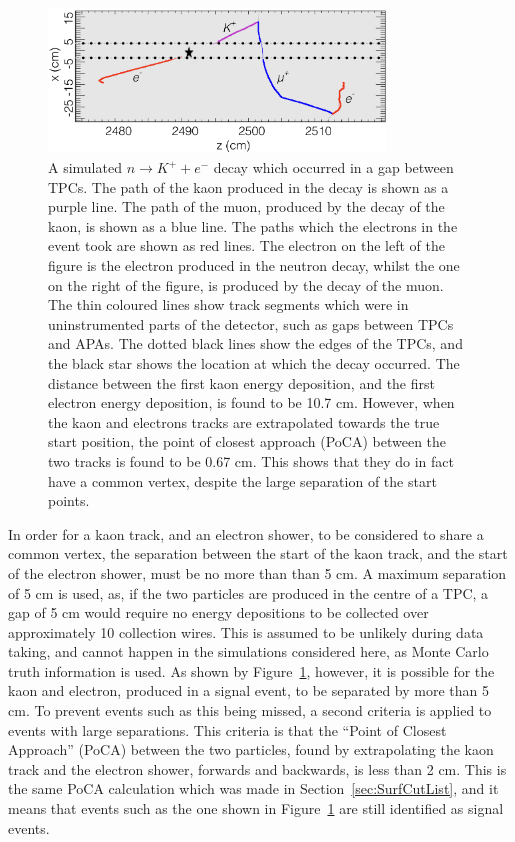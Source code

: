 \begin{figure}[h!]
  \centering
  \includegraphics[width=0.8\textwidth]{KaonElecBigGap}
  \caption[A simulated $n \rightarrow K^{+} + e^{-}$ decay which occurred in a gap between TPCs]
          {A simulated $n \rightarrow K^{+} + e^{-}$ decay which occurred in a gap between TPCs. The path of the kaon produced in the decay is shown as a purple line. The path of the muon, produced by the decay of the kaon, is shown as a blue line. The paths which the electrons in the event took are shown as red lines. The electron on the left of the figure is the electron produced in the neutron decay, whilst the one on the right of the figure, is produced by the decay of the muon. The thin coloured lines show track segments which were in uninstrumented parts of the detector, such as gaps between TPCs and APAs. The dotted black lines show the edges of the TPCs, and the black star shows the location at which the decay occurred. The distance between the first kaon energy deposition, and the first electron energy deposition, is found to be 10.7 cm. However, when the kaon and electrons tracks are extrapolated towards the true start position, the point of closest approach (PoCA) between the two tracks is found to be 0.67 cm. This shows that they do in fact have a common vertex, despite the large separation of the start points.} 
  \label{fig:NDK_Sig_KEBigGap}
\end{figure}

In order for a kaon track, and an electron shower, to be considered to share a common vertex, the separation between the start of the kaon track, and the start of the electron shower, must be no more than than 5 cm. A maximum separation of 5 cm is used, as, if the two particles are produced in the centre of a TPC, a gap of 5 cm would require no energy depositions to be collected over approximately 10 collection wires. This is assumed to be unlikely during data taking, and cannot happen in the simulations considered here, as Monte Carlo truth information is used. As shown by Figure~\ref{fig:NDK_Sig_KEBigGap}, however, it is possible for the kaon and electron, produced in a signal event, to be separated by more than 5 cm. To prevent events such as this being missed, a second criteria is applied to events with large separations. This criteria is that the ``Point of Closest Approach'' (PoCA) between the two particles, found by extrapolating the kaon track and the electron shower, forwards and backwards, is less than 2 cm. This is the same PoCA calculation which was made in Section~\ref{sec:SurfCutList}, and it means that events such as the one shown in Figure~\ref{fig:NDK_Sig_KEBigGap} are still identified as signal events. \\

